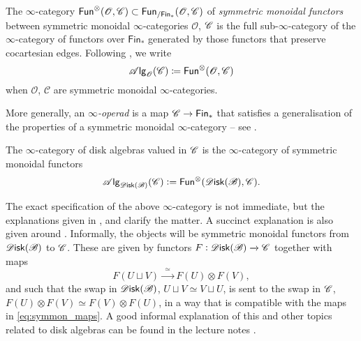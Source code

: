 \documentclass[../text]{subfiles}
\begin{document}
The $\infty$-category $\mathsf{Fun}^{\otimes}(\mathscr{O},\mathscr{C})\subset\mathsf{Fun}_{/\mathsf{Fin}_\ast}(\mathscr{O},\mathscr{C})$ of \emph{symmetric monoidal functors} between symmetric monoidal $\infty$-categories $\mathscr{O}$, $\mathscr{C}$ is the full sub-$\infty$-category of the $\infty$-category of functors over $\mathsf{Fin}_\ast$ generated by those functors that preserve cocartesian edges. Following \cite{aft_fhstrat}, we write 
\[
    \mathscr{A} \mathsf{lg}_{\mathscr{O}}(\mathscr{C})\coloneqq\mathsf{Fun}^{\otimes}(\mathscr{O},\mathscr{C})
\]
when $\mathscr{O}$, $\mathscr{C}$ are symmetric monoidal $\infty$-categories.

More generally, an \emph{$\infty$-operad} is a map $\mathscr{C}\to\mathsf{Fin}_\ast$ that satisfies a generalisation of the properties of a symmetric monoidal $\infty$-category -- see \cite[Definition 2.1.1.10]{lurie_ha}. 

\begin{definition}
    The $\infty$-category of disk algebras valued in $\mathscr{C}$ is the $\infty$-category of symmetric monoidal functors
    \begin{equation}
        \alg{\disk(\bstr)} (\catC) := \mathsf{Fun}^{\otimes}(\disk(\bstr), \catC).
    \end{equation}
\end{definition}


\begin{remark}
    The exact specification of the above $\infty$-category is not immediate, but the explanations given in \cite[def.2.0.0.7]{lurie_ha}, \cite[rem.2.1.2.19]{lurie_ha} and \cite[def.2.1.3.7]{lurie_ha} clarify the matter. A succinct explanation is also given around \cite[def.1.11]{aft_fhstrat}. Informally, the objects will be symmetric monoidal functors from $\disk(\bstr)$ to $\mathscr{C}$. These are given by functors $F:\disk(\bstr) \xrightarrow{} \catC$ together with maps
    \begin{equation}\label{eq:symmon_maps}
        F(U \sqcup V) \xrightarrow{\ \ \simeq \ \ } F(U) \otimes F(V),
    \end{equation}
    and such that the swap in $\disk(\bstr)$, $U \sqcup V \simeq V \sqcup U$, is sent to the swap in $\mathscr{C}$, $F(U) \otimes F(V) \simeq F(V) \otimes F(U)$, in a way that is compatible with the maps in \eqref{eq:symmon_maps}. A good informal explanation of this and other topics related to disk algebras can be found in the lecture notes \cite{tanaka20}.
\end{remark}
\end{document}
